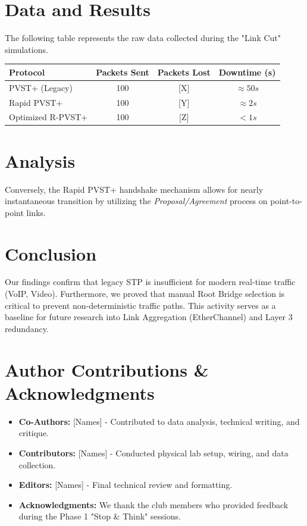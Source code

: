 \documentclass[12pt]{article}
\begin{document}
\section{Data and Results}
The following table represents the raw data collected during the "Link Cut" simulations.

\begin{center}
\begin{tabular}{lccc}
\toprule
\textbf{Protocol} & \textbf{Packets Sent} & \textbf{Packets Lost} & \textbf{Downtime (s)} \\ \midrule
PVST+ (Legacy)    & 100 & [X] & $\approx 50s$ \\
Rapid PVST+       & 100 & [Y] & $\approx 2s$ \\
Optimized R-PVST+ & 100 & [Z] & $< 1s$ \\ \bottomrule
\end{tabular}
\end{center}

\section{Analysis}


Conversely, the Rapid PVST+ handshake mechanism allows for nearly instantaneous transition by utilizing the \textit{Proposal/Agreement} process on point-to-point links.

\section{Conclusion}
Our findings confirm that legacy STP is insufficient for modern real-time traffic (VoIP, Video). Furthermore, we proved that manual Root Bridge selection is critical to prevent non-deterministic traffic paths. This activity serves as a baseline for future research into Link Aggregation (EtherChannel) and Layer 3 redundancy.

\section*{Author Contributions \& Acknowledgments}
\begin{itemize}
    \item \textbf{Co-Authors:} [Names] - Contributed to data analysis, technical writing, and critique.
    \item \textbf{Contributors:} [Names] - Conducted physical lab setup, wiring, and data collection.
    \item \textbf{Editors:} [Names] - Final technical review and formatting.
    \item \textbf{Acknowledgments:} We thank the club members who provided feedback during the Phase 1 "Stop \& Think" sessions.
\end{itemize}
\end{document}

